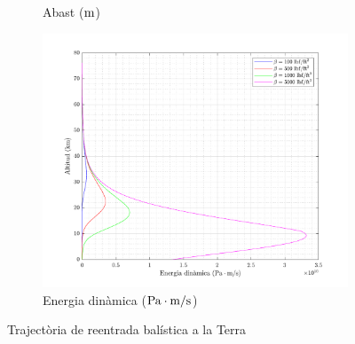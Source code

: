 \begin{figure}[ht]
\begin{subfigure}[t]{.33\textwidth}
        \captionsetup{skip=0pt}
        \caption{Abast ($\meter$)}
    \end{subfigure}%
    \begin{subfigure}[t]{.33\textwidth}
        \centering
        \includegraphics[width=\linewidth]{imagenes/01_ballistic_graficas/energia_dinamica_no_title.pdf}
        \captionsetup{skip=0pt}
        \caption{Energia dinàmica ($\pascal \cdot \meter/\second$)}
    \end{subfigure}
    \caption{Trajectòria de reentrada balística a la Terra}
    \label{fig:ballistic_terrestre}
\end{figure}

